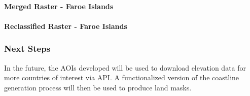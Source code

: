\documentclass[]{article}
\let\oldparagraph\paragraph
\renewcommand{\paragraph}[1]{\oldparagraph{#1}\mbox{}}
\begin{document}
\paragraph{Merged Raster - Faroe
Islands}\label{merged-raster---faroe-islands}

\paragraph{Reclassified Raster - Faroe
Islands}\label{reclassified-raster---faroe-islands}

\subsubsection{Next Steps}\label{next-steps}

In the future, the AOIs developed will be used to download elevation
data for more countries of interest via API. A functionalized version of
the coastline generation process will then be used to produce land
masks.
\end{document}
